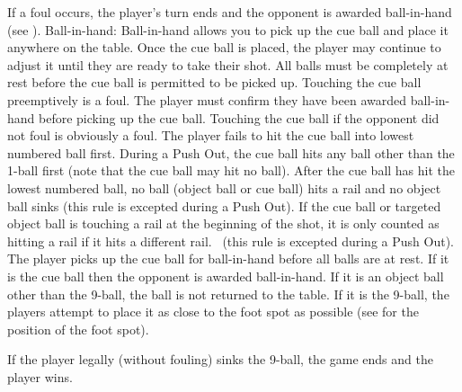  If a foul occurs, the player's turn ends and the opponent is awarded ball-in-hand (see ).%
Ball-in-hand:
\subruleitem Ball-in-hand allows you to pick up the cue ball and place it anywhere on the table.%
\subruleitem Once the cue ball is placed, the player may continue to adjust it until they are ready to take their shot.%
\subruleitem All balls must be completely at rest before the cue ball is permitted to be picked up. Touching the cue ball preemptively is a foul.%
\subruleitem The player must confirm they have been awarded ball-in-hand before picking up the cue ball. Touching the cue ball if the opponent did not foul is obviously a foul.%
 {}%
 \FoulCircumstances%
\subruleitem The player fails to hit the cue ball into lowest numbered ball first.%
\subruleitem During a Push Out, the cue ball hits any ball other than the 1-ball first (note that the cue ball may hit no ball).
\subruleitem After the cue ball has hit the lowest numbered ball, no ball (object ball or cue ball) hits a rail and no object ball sinks (this rule is excepted during a Push Out).%
\subsubruleitem If the cue ball or targeted object ball is touching a rail at the beginning of the shot, it is only counted as hitting a rail if it hits a different rail.%
\subruleitem \CueBallMiss\ (this rule is excepted during a Push Out).%
\subruleitem \CueBallSink%
\subruleitem \CueBallPreemptive%
\subruleitem The player picks up the cue ball for ball-in-hand before all balls are at rest.%
\subruleitem {}%
\subruleitem \PushShot%
\subruleitem \BallOffTable%
\subsubruleitem If it is the cue ball then the opponent is awarded ball-in-hand.%
\subsubruleitem If it is an object ball other than the 9-ball, the ball is not returned to the table.%
\subsubruleitem If it is the 9-ball, the players attempt to place it as close to the foot spot as possible (see  for the position of the foot spot).%
\subruleitem \JumpShot%
\subruleitem \TableMovement%
\subruleitem {}%
%


 If the player legally (without fouling) sinks the 9-ball, the game ends and the player wins.%
 {}%
 {}%
 {}%


%
 {}%
 {}%
 \Sportsmanship%
